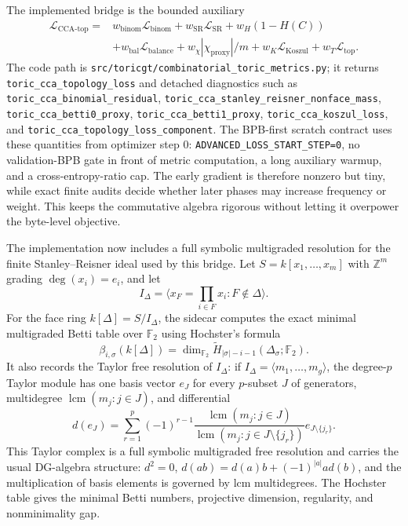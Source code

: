 \documentclass[11pt]{article}
\theoremstyle{definition}
\theoremstyle{plain}
\theoremstyle{remark}
\numberwithin{equation}{section}
\begin{document}
The implemented bridge is the bounded auxiliary
\begin{equation}
\begin{split}
  \mathcal L_{\mathrm{CCA}\text{-}\mathrm{top}}
  ={}&
  w_{\mathrm{binom}}\mathcal L_{\mathrm{binom}}
  +w_{\mathrm{SR}}\mathcal L_{\mathrm{SR}}
  +w_H(1-H(C))\\
  &+w_{\mathrm{bal}}\mathcal L_{\mathrm{balance}}
  +w_\chi|\chi_{\mathrm{proxy}}|/m
  +w_K\mathcal L_{\mathrm{Koszul}}
  +w_T\mathcal L_{\mathrm{top}}.
\end{split}
\end{equation}
The code path is \texttt{src/toricgt/combinatorial\_toric\_metrics.py}; it returns \texttt{toric\_cca\_topology\_loss} and detached diagnostics such as \texttt{toric\_cca\_binomial\_residual}, \texttt{toric\_cca\_stanley\_reisner\_nonface\_mass}, \texttt{toric\_cca\_betti0\_proxy}, \texttt{toric\_cca\_betti1\_proxy}, \texttt{toric\_cca\_koszul\_loss}, and \texttt{toric\_cca\_topology\_loss\_component}.  The BPB-first scratch contract uses these quantities from optimizer step $0$: \texttt{ADVANCED\_LOSS\_START\_STEP=0}, no validation-BPB gate in front of metric computation, a long auxiliary warmup, and a cross-entropy-ratio cap.  The early gradient is therefore nonzero but tiny, while exact finite audits decide whether later phases may increase frequency or weight.  This keeps the commutative algebra rigorous without letting it overpower the byte-level objective.

The implementation now includes a full symbolic multigraded resolution for the finite Stanley--Reisner ideal used by this bridge.  Let $S=k[x_1,\ldots,x_m]$ with $\mathbb Z^m$ grading $\deg(x_i)=e_i$, and let
\[
  I_\Delta=\langle x_F=\prod_{i\in F}x_i : F\notin\Delta\rangle .
\]
For the face ring $k[\Delta]=S/I_\Delta$, the sidecar computes the exact minimal multigraded Betti table over $\mathbb F_2$ using Hochster's formula
\[
  \beta_{i,\sigma}(k[\Delta])
  =
  \dim_{\mathbb F_2}\widetilde H_{|\sigma|-i-1}(\Delta_\sigma;\mathbb F_2).
\]
It also records the Taylor free resolution of $I_\Delta$: if $I_\Delta=\langle m_1,\ldots,m_g\rangle$, the degree-$p$ Taylor module has one basis vector $e_J$ for every $p$-subset $J$ of generators, multidegree $\operatorname{lcm}(m_j:j\in J)$, and differential
\[
  d(e_J)=
  \sum_{r=1}^{p}(-1)^{r-1}
  \frac{\operatorname{lcm}(m_j:j\in J)}
       {\operatorname{lcm}(m_j:j\in J\setminus\{j_r\})}
  e_{J\setminus\{j_r\}}.
\]
This Taylor complex is a full symbolic multigraded free resolution and carries the usual DG-algebra structure: $d^2=0$, $d(ab)=d(a)b+(-1)^{|a|}ad(b)$, and the multiplication of basis elements is governed by lcm multidegrees.  The Hochster table gives the minimal Betti numbers, projective dimension, regularity, and nonminimality gap.
\end{document}
